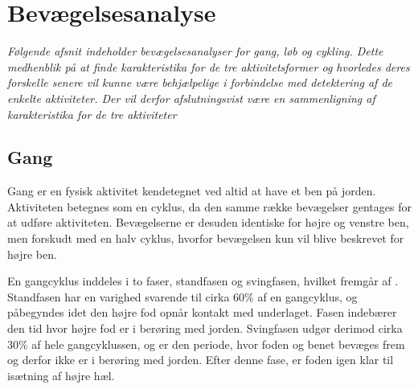 \section{Bevægelsesanalyse} \label{bevaegelse}
%
\textit{Følgende afsnit indeholder bevægelsesanalyser for gang, løb og cykling. Dette medhenblik på at finde karakteristika for de tre aktivitetsformer og hvorledes deres forskelle senere vil kunne være behjælpelige i forbindelse med detektering af de enkelte aktiviteter. Der vil derfor afslutningsvist være en sammenligning af karakteristika for de tre aktiviteter}

\subsection{Gang}
Gang er en fysisk aktivitet kendetegnet ved altid at have et ben på jorden. Aktiviteten betegnes som en cyklus, da den samme række bevægelser gentages for at udføre aktiviteten. Bevægelserne er desuden identiske for højre og venstre ben, men forskudt med en halv cyklus, hvorfor bevægelsen kun vil blive beskrevet for højre ben. \citep{VaughanDavisOConnor1992,Whittle1990} 

En gangcyklus inddeles i to faser, standfasen og svingfasen, hvilket fremgår af . Standfasen har en varighed svarende til cirka 60\% af en gangcyklus, og påbegyndes idet den højre fod opnår kontakt med underlaget. Fasen indebærer den tid hvor højre fod er i berøring med jorden. Svingfasen udgør derimod cirka 30\% af hele gangcyklussen, og er den periode, hvor foden og benet bevæges frem og derfor ikke er i berøring med jorden. Efter denne fase, er foden igen klar til isætning af højre hæl. \citep{VaughanDavisOConnor1992}

